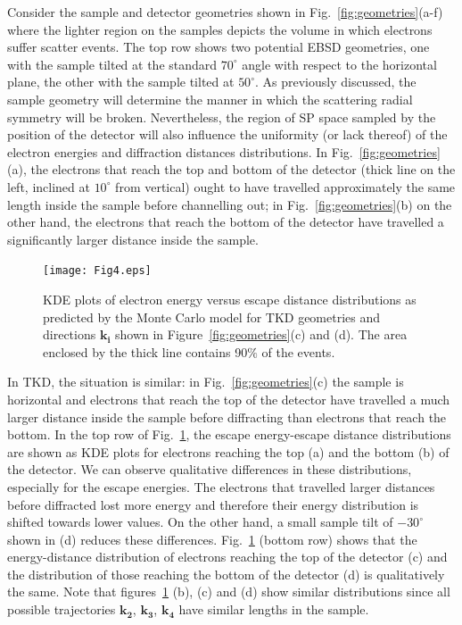 Consider the sample and detector geometries shown in Fig.~\ref{fig:geometries}(a-f) where the lighter region on the samples depicts the volume in which electrons suffer scatter events. The top row shows two potential EBSD geometries, one with the sample tilted at the standard $70^{\circ}$ angle with respect to the horizontal plane, the other with the sample tilted at $50^{\circ}$. As previously discussed, the sample geometry will determine the manner in which the scattering radial symmetry will be broken. Nevertheless, the region of SP space sampled by the position of the detector will also influence the uniformity (or lack thereof) of the electron energies and diffraction distances distributions. In Fig.~\ref{fig:geometries}(a), the electrons that reach the top and bottom of the detector (thick line on the left, inclined at $10^{\circ}$ from vertical) ought to have travelled approximately the same length inside the sample before channelling out; in Fig.~\ref{fig:geometries}(b) on the other hand, the electrons that reach the bottom of the detector have travelled a significantly larger distance inside the sample. 

\begin{figure}[t]
\centering\leavevmode
\texttt{[image: Fig4.eps]}%
\caption{KDE plots of electron energy versus escape distance distributions as predicted by the Monte Carlo model for TKD geometries and directions $\mathbf{k_i}$ shown in Figure~\ref{fig:geometries}(c) and (d). The area enclosed by the thick line contains 90$\%$ of the events.}
\label{fig:ks}
\end{figure}

In TKD, the situation is similar: in Fig.~\ref{fig:geometries}(c) the sample is horizontal and electrons that reach the top of the detector have travelled a much larger distance inside the sample before diffracting than electrons that reach the bottom. In the top row of Fig.~\ref{fig:ks}, the escape energy-escape distance distributions are shown as KDE plots for electrons reaching the top (a) and the bottom (b) of the detector. We can observe qualitative differences in these distributions, especially for the escape energies. The electrons that travelled larger distances before diffracted lost more energy and therefore their energy distribution is shifted towards lower values. On the other hand, a small sample tilt of $-30^{\circ}$ shown in (d) reduces these differences. Fig.~\ref{fig:ks} (bottom row) shows that the energy-distance distribution of electrons reaching the top of the detector (c) and the distribution of those reaching the bottom of the detector (d) is qualitatively the same. Note that figures~\ref{fig:ks} (b), (c) and (d) show similar distributions since all possible trajectories $\mathbf{k_2}$, $\mathbf{k_3}$, $\mathbf{k_4}$ have similar lengths in the sample.


